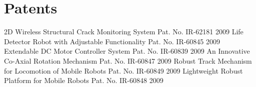 \section{Patents}
\begin{cvhonors}
  \cvhonor
    {2D Wireless Structural Crack Monitoring System}
    {Pat. No. IR-62181}
    {}
    {2009}
  \cvhonor
    {Life Detector Robot with Adjustable Functionality}
    {Pat. No. IR-60845}
    {}
    {2009}
  \cvhonor
    {Extendable DC Motor Controller System}
    {Pat. No. IR-60839}
    {}
    {2009}
  \cvhonor
    {An Innovative Co-Axial Rotation Mechanism}
    {Pat. No. IR-60847}
    {}
    {2009}
  \cvhonor
    {Robust Track Mechanism for Locomotion of Mobile Robots}
    {Pat. No. IR-60849}
    {}
    {2009}
  \cvhonor
    {Lightweight Robust Platform for Mobile Robots}
    {Pat. No. IR-60848}
    {}
    {2009}
\end{cvhonors} 
